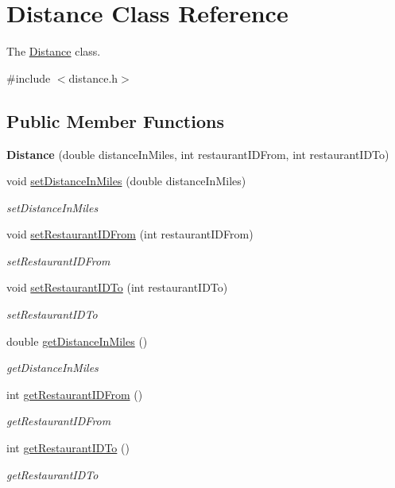 \hypertarget{class_distance}{}\section{Distance Class Reference}
\label{class_distance}


The \hyperlink{class_distance}{Distance} class.  




{\ttfamily \#include $<$distance.\+h$>$}

\subsection*{Public Member Functions}
\begin{DoxyCompactItemize}
\item 
\mbox{\label{class_distance_a32421795b03aa6284476000229aa1c17}} 
{\bfseries Distance} (double distance\+In\+Miles, int restaurant\+I\+D\+From, int restaurant\+I\+D\+To)
\item 
void \hyperlink{class_distance_a2bbd9bef5a6f0692aa1b4d8b5ce9344f}{set\+Distance\+In\+Miles} (double distance\+In\+Miles)
\begin{DoxyCompactList}\small\item\em set\+Distance\+In\+Miles \end{DoxyCompactList}\item 
void \hyperlink{class_distance_ae91858d0705925be8f96d586844697ec}{set\+Restaurant\+I\+D\+From} (int restaurant\+I\+D\+From)
\begin{DoxyCompactList}\small\item\em set\+Restaurant\+I\+D\+From \end{DoxyCompactList}\item 
void \hyperlink{class_distance_a3fc24cd557605c2731ed9f379da3bb94}{set\+Restaurant\+I\+D\+To} (int restaurant\+I\+D\+To)
\begin{DoxyCompactList}\small\item\em set\+Restaurant\+I\+D\+To \end{DoxyCompactList}\item 
double \hyperlink{class_distance_acc0170b8899fed2a86e4487e12b1ebe9}{get\+Distance\+In\+Miles} ()
\begin{DoxyCompactList}\small\item\em get\+Distance\+In\+Miles \end{DoxyCompactList}\item 
int \hyperlink{class_distance_a6aad4761255f0a1dafafab7e98283a81}{get\+Restaurant\+I\+D\+From} ()
\begin{DoxyCompactList}\small\item\em get\+Restaurant\+I\+D\+From \end{DoxyCompactList}\item 
int \hyperlink{class_distance_ad523bb34afe88d178a1cb494220244bb}{get\+Restaurant\+I\+D\+To} ()
\begin{DoxyCompactList}\small\item\em get\+Restaurant\+I\+D\+To \end{DoxyCompactList}\end{DoxyCompactItemize}


